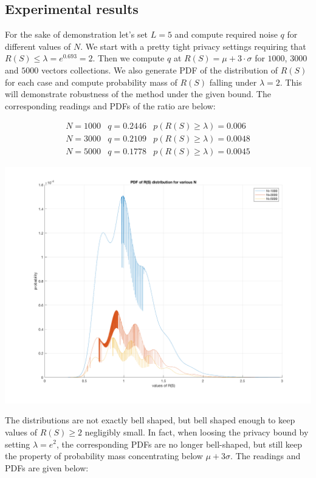 \documentclass[11pt]{article}
\begin{document}
\subsection{Experimental results}
 
 For the sake of demonstration let's set $L=5$ and compute required noise $q$ for different values of $N$.
 We start with a pretty tight privacy settings requiring that $R(S) \le \lambda = e^{0.693} = 2$.  Then we compute $q$ at $R(S) = \mu + 3\cdot \sigma$ for $1000$, $3000$ and $5000$ vectors collections.  We also generate PDF of the distribution of $R(S)$ for each case and compute probability mass of $R(S)$ falling under $\lambda = 2$.  This will demonstrate robustness of the method under the given bound.  The corresponding readings and PDFs of the ratio are below:  
 
 \[
  \begin{matrix}N = 1000 & q = 0.2446 & p(R(S) \ge \lambda) = 0.006 \\
  N= 3000 & q = 0.2109 & p(R(S) \ge \lambda) = 0.0048  \\
  N=5000 & q = 0.1778 & p(R(S) \ge \lambda) =0.0045 \end{matrix}
 \]
 
\includegraphics[scale =  0.25]{xyz.png}
 
 The distributions are not exactly bell shaped, but bell shaped enough to keep values of $R(S) \ge 2$ negligibly small. In fact, when loosing the privacy bound by setting  $\lambda = e^2$, the corresponding PDFs  are no longer bell-shaped, but still keep the property of probability mass concentrating below $\mu + 3\sigma$.   The readings and PDFs are given below:
 
\end{document}
